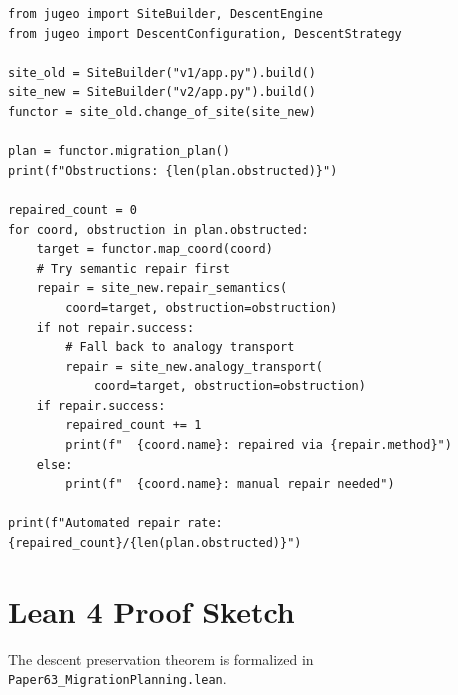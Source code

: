 \documentclass[11pt]{article}
\begin{document}
\begin{lstlisting}[style=jugeo-python]
from jugeo import SiteBuilder, DescentEngine
from jugeo import DescentConfiguration, DescentStrategy

site_old = SiteBuilder("v1/app.py").build()
site_new = SiteBuilder("v2/app.py").build()
functor = site_old.change_of_site(site_new)

plan = functor.migration_plan()
print(f"Obstructions: {len(plan.obstructed)}")

repaired_count = 0
for coord, obstruction in plan.obstructed:
    target = functor.map_coord(coord)
    # Try semantic repair first
    repair = site_new.repair_semantics(
        coord=target, obstruction=obstruction)
    if not repair.success:
        # Fall back to analogy transport
        repair = site_new.analogy_transport(
            coord=target, obstruction=obstruction)
    if repair.success:
        repaired_count += 1
        print(f"  {coord.name}: repaired via {repair.method}")
    else:
        print(f"  {coord.name}: manual repair needed")

print(f"Automated repair rate: {repaired_count}/{len(plan.obstructed)}")
\end{lstlisting}

\section{Lean 4 Proof Sketch}\label{sec:lean-proof}

The descent preservation theorem is formalized in
\texttt{Paper63\_MigrationPlanning.lean}.
\end{document}
